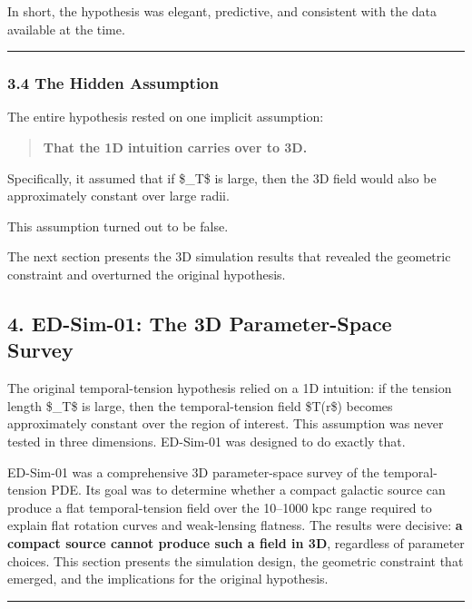 In short, the hypothesis was elegant, predictive, and consistent with
the data available at the time.

\begin{center}\rule{0.5\linewidth}{0.5pt}\end{center}

\subsubsection{3.4 The Hidden Assumption}\label{the-hidden-assumption}

The entire hypothesis rested on one implicit assumption:

\begin{quote}
\textbf{That the 1D intuition carries over to 3D.}
\end{quote}

Specifically, it assumed that if \$\ell\_T\$ is large, then the 3D field
would also be approximately constant over large radii.

This assumption turned out to be false.

The next section presents the 3D simulation results that revealed the
geometric constraint and overturned the original hypothesis.

\subsection{4. ED-Sim-01: The 3D Parameter-Space
Survey}\label{ed-sim-01-the-3d-parameter-space-survey}

The original temporal-tension hypothesis relied on a 1D intuition: if
the tension length \$\ell\_T\$ is large, then the temporal-tension field
\$T(r\$) becomes approximately constant over the region of interest.
This assumption was never tested in three dimensions. ED-Sim-01 was
designed to do exactly that.

ED-Sim-01 was a comprehensive 3D parameter-space survey of the
temporal-tension PDE. Its goal was to determine whether a compact
galactic source can produce a flat temporal-tension field over the
10--1000 kpc range required to explain flat rotation curves and
weak-lensing flatness. The results were decisive: \textbf{a compact
source cannot produce such a field in 3D}, regardless of parameter
choices. This section presents the simulation design, the geometric
constraint that emerged, and the implications for the original
hypothesis.

\begin{center}\rule{0.5\linewidth}{0.5pt}\end{center}

